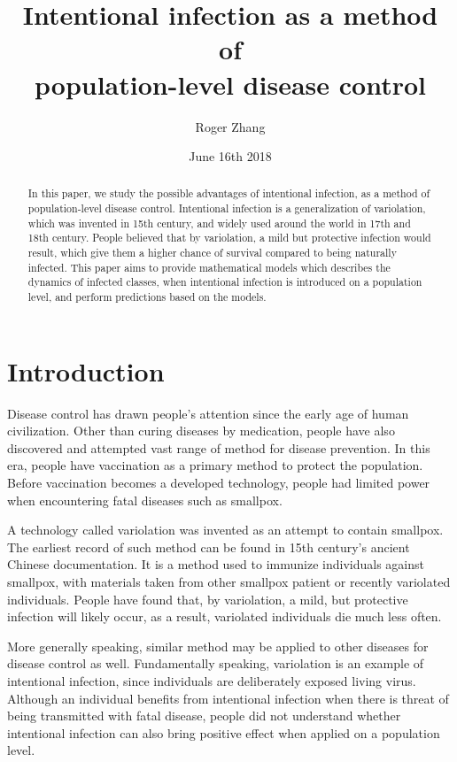 \documentclass[12pt]{article}
\title{Intentional infection as a method of\\population-level disease control}
\author{Roger Zhang}
\date{June 16th 2018}
\begin{document}
\maketitle
\begin{abstract}
In this paper, we study the possible advantages of intentional infection, as a method of population-level disease control. Intentional infection is a generalization of variolation, which was invented in 15th century, and widely used around the world in 17th and 18th century. People believed that by variolation, a mild but protective infection would result, which give them a higher chance of survival compared to being naturally infected. This paper aims to provide mathematical models which describes the dynamics of infected classes, when intentional infection is introduced on a population level, and perform predictions based on the models.
\end{abstract}
\clearpage
\tableofcontents
\clearpage
\section{Introduction}
Disease control has drawn people's attention since the early age of human civilization. Other than curing diseases by medication, people have also discovered and attempted vast range of method for disease prevention. In this era, people have vaccination as a primary method to protect the population. Before vaccination becomes a developed technology, people had limited power when encountering fatal diseases such as smallpox.

A technology called variolation was invented as an attempt to contain smallpox. The earliest record of such method can be found in 15th century's ancient Chinese documentation. It is a method used to immunize individuals against smallpox, with materials taken from other smallpox patient or recently variolated individuals. People have found that, by variolation, a mild, but protective infection will likely occur, as a result, variolated individuals die much less often.

More generally speaking, similar method may be applied to other diseases for disease control as well. Fundamentally speaking, variolation is an example of intentional infection, since individuals are deliberately exposed living virus. Although an individual benefits from intentional infection when there is threat of being transmitted with fatal disease, people did not understand whether intentional infection can also bring positive effect when applied on a population level. 
\end{document}
